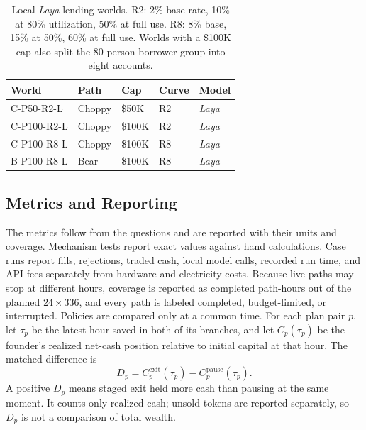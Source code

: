 \begin{table}[t]
\caption{Local \textit{Laya} lending worlds. R2: 2\% base rate, 10\% at 80\% utilization,
50\% at full use. R8: 8\% base, 15\% at 50\%, 60\% at full use. Worlds with a
\$100K cap also split the 80-person borrower group into eight accounts.}
\label{tab:lending-design}
\centering\footnotesize
\renewcommand{\arraystretch}{1.1}
\begin{tabular}{@{}lllll@{}}
\toprule
World & Path & Cap & Curve & Model \\
\midrule
C-P50-R2-L & Choppy & \$50K & R2 & \textit{Laya} \\
C-P100-R2-L & Choppy & \$100K & R2 & \textit{Laya} \\
C-P100-R8-L & Choppy & \$100K & R8 & \textit{Laya} \\
B-P100-R8-L & Bear & \$100K & R8 & \textit{Laya} \\
\bottomrule
\end{tabular}
\end{table}

\subsection{Metrics and Reporting}\label{sec:eval-metrics}
The metrics follow from the questions and are reported with their units and
coverage. Mechanism tests report exact values against hand calculations.
Case runs report fills, rejections, traded cash, local model calls, recorded
run time, and API fees separately from hardware and electricity costs. Because live paths may stop at different hours, coverage is
reported as completed path-hours out of the planned $24\times336$, and every
path is labeled completed, budget-limited, or interrupted. Policies are
compared only at a common time. For each plan pair $p$, let $\tau_p$ be the
latest hour saved in both of its branches, and let $C_p(\tau_p)$ be the
founder's realized net-cash position relative to initial capital at that hour. The matched difference is
\begin{equation}
D_p=C^{\mathrm{exit}}_p(\tau_p)-C^{\mathrm{pause}}_p(\tau_p).
\label{eq:matched}
\end{equation}
A positive $D_p$ means staged exit held more cash than pausing at the same
moment. It counts only realized cash; unsold tokens are reported separately,
so $D_p$ is not a comparison of total wealth.

